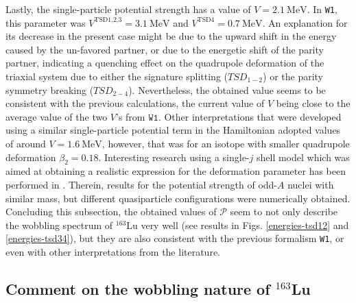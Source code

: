 \documentclass[myclassdoc,debug]{rjparticle}
\begin{document}
Lastly, the single-particle potential strength has a value of $V=2.1\ \text{MeV}$. In \texttt{W1}, this parameter was $V^{\text{TSD1,2,3}}=3.1\ \text{MeV}$ and $V^\text{TSD4}=0.7\ \text{MeV}$. An explanation for its decrease in the present case might be due to the upward shift in the energy caused by the un-favored partner, or due to the energetic shift of the parity partner, indicating a quenching effect on the quadrupole deformation of the triaxial system due to either the signature splitting ($TSD_{1-2}$) or the parity symmetry breaking ($TSD_{2-4}$). Nevertheless, the obtained value seems to be consistent with the previous calculations, the current value of $V$ being close to the average value of the two $V$'s from $\texttt{W1}$. Other interpretations \cite{tanabe2017stability} that were developed using a similar single-particle potential term in the Hamiltonian adopted values of around $V=1.6\ \text{MeV}$, however, that was for an isotope with smaller quadrupole deformation $\beta_2=0.18$. Interesting research using a single-$j$ shell model which was aimed at obtaining a realistic expression for the deformation parameter has been performed in \cite{shou2009coupling}. Therein, results for the potential strength of odd-$A$ nuclei with similar mass, but different quasiparticle configurations were numerically obtained. Concluding this subsection, the obtained values of $\mathcal{P}$ seem to not only describe the wobbling spectrum of $^{163}$Lu very well (see results in Figs. \ref{energies-tsd12} and \ref{energies-tsd34}), but they are also consistent with the previous formalism \texttt{W1}, or even with other interpretations from the literature. 

\subsection{\texorpdfstring{Comment on the wobbling nature of $^{163}$Lu}%
                               {Comment on the wobbling nature of 163Lu}}\label{wobbling-comment}
\end{document}
